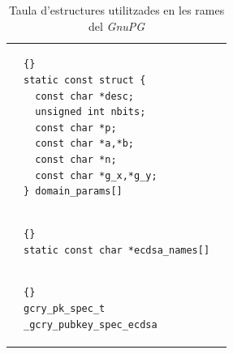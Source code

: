 \documentclass[12pt,twoside,catalan,a4paper]{book}%
\numberwithin{figure}{section}		%
\theoremstyle{definition}   			%
\theoremstyle{saltolinea}   			%
\begin{document}
\begin{table}[H]
\begin{center}
\begin{sideways}
\begin{tabular}{|l||l|l|}
 &\\
\hline
 &
 {\tt \begin{lstlisting}{}
static const struct {
  const char *desc;
  unsigned int nbits;
  const char *p;
  const char *a,*b;
  const char *n;
  const char *g_x,*g_y;
} domain_params[]
 \end{lstlisting} }
 &\\
\hline
 &
 {\tt \begin{lstlisting}{}
static const char *ecdsa_names[]
 \end{lstlisting} }
 &\\
\hline
 &
 {\tt \begin{lstlisting}{}
gcry_pk_spec_t
_gcry_pubkey_spec_ecdsa
 \end{lstlisting} }
 &\\
\hline
\end{tabular}
\end{sideways}
\end{center}
\caption{Taula d'estructures utilitzades en les rames del \emph{GnuPG}\label{tab:struct}}
\end{table}
\end{document}
